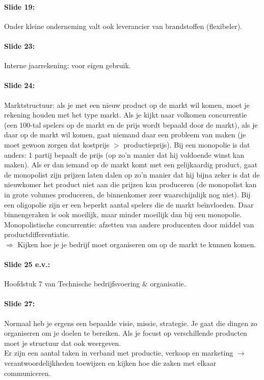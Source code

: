 \documentclass[10pt,a4paper]{report}
\begin{document}
\paragraph{Slide 19:} Onder kleine onderneming valt ook leverancier van brandstoffen (flexibeler).

\paragraph{Slide 23:} Interne jaarrekening: voor eigen gebruik.

\paragraph{Slide 24:} Marktstructuur: als je met een nieuw product op de markt wil komen, moet je rekening houden met het type markt. Als je kijkt naar volkomen concurrentie (een 100-tal spelers op de markt en de prijs wordt bepaald door de markt), als je daar op de markt wil komen, gaat niemand daar een probleem van maken (je moet gewoon zorgen dat kostprijs $>$ productieprijs). Bij een monopolie is dat anders: 1 partij bepaalt de prijs (op zo'n manier dat hij voldoende winst kan maken). Als er dan iemand op de markt komt met een gelijkaardig product, gaat de monopolist zijn prijzen laten dalen op zo'n manier dat hij bijna zeker is dat de nieuwkomer het product niet aan die prijzen kan produceren (de monopolist kan in grote volumes produceren, de binnenkomer zeer waarschijnlijk nog niet). Bij een oligopolie zijn er een beperkt aantal spelers die de markt be\"invloeden. Daar binnengeraken is ook moeilijk, maar minder moeilijk dan bij een monopolie. Monopolistische concurrentie: afzetten van andere producenten door middel van productdifferentiatie.\\
$\Rightarrow$ Kijken hoe je je bedrijf moet organiseren om op de markt te kunnen komen.

\paragraph{Slide 25 e.v.:} Hoofdstuk 7 van Technische bedrijfsvoering $\&$ organisatie.

\paragraph{Slide 27:} Normaal heb je ergens een bepaalde visie, missie, strategie. Je gaat die dingen zo organiseren om je doelen te bereiken. Als je focust op verschillende producten moet je structuur dat ook weergeven.\\
Er zijn een aantal taken in verband met productie, verkoop en marketing $\rightarrow$ verantwoordelijkheden toewijzen en kijken hoe die zaken met elkaar communiceren.
\end{document}
